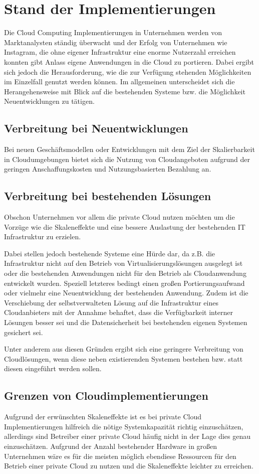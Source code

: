 \section{Stand der Implementierungen}
\label{sec_implementations}
Die Cloud Computing Implementierungen in Unternehmen werden von Marktanalysten ständig überwacht und der Erfolg von Unternehmen wie Instagram, die ohne eigener Infrastruktur eine enorme Nutzerzahl erreichen konnten gibt Anlass eigene Anwendungen in die Cloud zu portieren. Dabei ergibt sich jedoch die Herausforderung, wie die zur Verfügung stehenden Möglichkeiten im Einzelfall genutzt werden können. Im allgemeinen unterscheidet sich die Herangehensweise mit Blick auf die bestehenden Systeme bzw. die Möglichkeit Neuentwicklungen zu tätigen.

\subsection{Verbreitung bei Neuentwicklungen}
Bei neuen Geschäftsmodellen oder Entwicklungen mit dem Ziel der Skalierbarkeit in Cloudumgebungen bietet sich die Nutzung von Cloudangeboten aufgrund der geringen Anschaffungskosten und Nutzungsbasierten Bezahlung an.

\subsection{Verbreitung bei bestehenden Lösungen}
Obschon Unternehmen vor allem die private Cloud nutzen möchten um die Vorzüge wie die Skaleneffekte und eine bessere Auslastung der bestehenden IT Infrastruktur zu erzielen. 

Dabei stellen jedoch bestehende Systeme eine Hürde dar, da z.B. die Infrastruktur nicht auf den Betrieb von Virtualisierungslösungen ausgelegt ist oder die bestehenden Anwendungen nicht für den Betrieb als Cloudanwendung entwickelt wurden. Speziell letzteres bedingt einen großen Portierungsaufwand oder vielmehr eine Neuentwicklung der bestehenden Anwendung. Zudem ist die Verschiebung der selbstverwalteten Lösung auf die Infrastruktur eines Cloudanbieters mit der Annahme behaftet, dass die Verfügbarkeit interner Lösungen besser sei und die Datensicherheit bei bestehenden eigenen Systemen gesichert sei.

Unter anderem aus diesen Gründen ergibt sich eine geringere Verbreitung von Cloudlösungen, wenn diese neben existierenden Systemen bestehen bzw. statt diesen eingeführt werden sollen.

\subsection{Grenzen von Cloudimplementierungen}
Aufgrund der erwünschten Skaleneffekte ist es bei private Cloud Implementierungen hilfreich die nötige Systemkapazität richtig einzuschätzen, allerdings sind Betreiber einer private Cloud häufig nicht in der Lage dies genau einzuschätzen. Aufgrund der Anzahl bestehender Hardware in großen Unternehmen wäre es für die meisten möglich ebendiese Ressourcen für den Betrieb einer private Cloud zu nutzen und die Skaleneffekte leichter zu erreichen.

